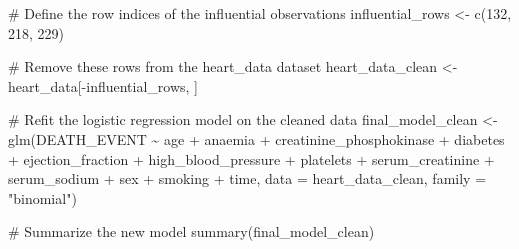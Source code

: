 \documentclass[
  letterpaper,
  DIV=11,
  numbers=noendperiod]{scrartcl}
\newenvironment{Shaded}{\begin{snugshade}}{\end{snugshade}}
\newcommand{\AttributeTok}[1]{\textcolor[rgb]{0.40,0.45,0.13}{#1}}
\newcommand{\CommentTok}[1]{\textcolor[rgb]{0.37,0.37,0.37}{#1}}
\newcommand{\DecValTok}[1]{\textcolor[rgb]{0.68,0.00,0.00}{#1}}
\newcommand{\FunctionTok}[1]{\textcolor[rgb]{0.28,0.35,0.67}{#1}}
\newcommand{\NormalTok}[1]{\textcolor[rgb]{0.00,0.23,0.31}{#1}}
\newcommand{\OtherTok}[1]{\textcolor[rgb]{0.00,0.23,0.31}{#1}}
\newcommand{\SpecialCharTok}[1]{\textcolor[rgb]{0.37,0.37,0.37}{#1}}
\newcommand{\StringTok}[1]{\textcolor[rgb]{0.13,0.47,0.30}{#1}}
\begin{document}
\begin{Shaded}
\begin{Highlighting}[]
\CommentTok{\# Define the row indices of the influential observations}
\NormalTok{influential\_rows }\OtherTok{\textless{}{-}} \FunctionTok{c}\NormalTok{(}\DecValTok{132}\NormalTok{, }\DecValTok{218}\NormalTok{, }\DecValTok{229}\NormalTok{)}

\CommentTok{\# Remove these rows from the heart\_data dataset}
\NormalTok{heart\_data\_clean }\OtherTok{\textless{}{-}}\NormalTok{ heart\_data[}\SpecialCharTok{{-}}\NormalTok{influential\_rows, ]}

\CommentTok{\# Refit the logistic regression model on the cleaned data}
\NormalTok{final\_model\_clean }\OtherTok{\textless{}{-}} \FunctionTok{glm}\NormalTok{(DEATH\_EVENT }\SpecialCharTok{\textasciitilde{}}\NormalTok{ age }\SpecialCharTok{+}\NormalTok{ anaemia }\SpecialCharTok{+}\NormalTok{ creatinine\_phosphokinase }\SpecialCharTok{+}\NormalTok{ diabetes }\SpecialCharTok{+}\NormalTok{ ejection\_fraction }\SpecialCharTok{+}\NormalTok{ high\_blood\_pressure }\SpecialCharTok{+}\NormalTok{ platelets }\SpecialCharTok{+}\NormalTok{ serum\_creatinine }\SpecialCharTok{+}\NormalTok{ serum\_sodium }\SpecialCharTok{+}\NormalTok{ sex }\SpecialCharTok{+}\NormalTok{ smoking }\SpecialCharTok{+}\NormalTok{ time, }\AttributeTok{data =}\NormalTok{ heart\_data\_clean, }\AttributeTok{family =} \StringTok{"binomial"}\NormalTok{)}

\CommentTok{\# Summarize the new model}
\FunctionTok{summary}\NormalTok{(final\_model\_clean)}
\end{Highlighting}
\end{Shaded}
\end{document}
